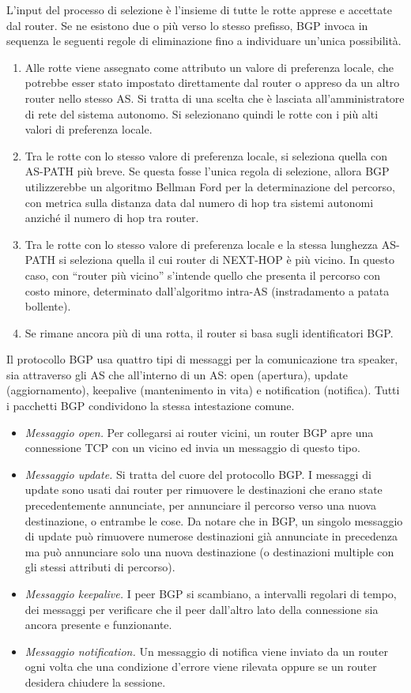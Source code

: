 L’input del processo di selezione è l’insieme di tutte le rotte apprese e accettate dal router. Se ne esistono due o più verso lo stesso prefisso, BGP invoca in sequenza le seguenti regole di eliminazione fino a individuare un’unica possibilità.
\begin{enumerate}
    \item Alle rotte viene assegnato come attributo un valore di preferenza locale, che potrebbe esser stato impostato direttamente dal router o appreso da un altro router nello stesso AS. Si tratta di una scelta che è lasciata all’amministratore di rete del sistema autonomo. Si selezionano quindi le rotte con i più alti valori di preferenza locale.
    \item Tra le rotte con lo stesso valore di preferenza locale, si seleziona quella con AS-PATH più breve. Se questa fosse l’unica regola di selezione, allora BGP utilizzerebbe un algoritmo Bellman Ford per la determinazione del percorso, con metrica sulla distanza data dal numero di hop tra sistemi autonomi anziché il numero di hop tra router.
    \item Tra le rotte con lo stesso valore di preferenza locale e la stessa lunghezza AS-PATH si seleziona quella il cui router di NEXT-HOP è più vicino. In questo caso, con “router più vicino” s’intende quello che presenta il percorso con costo minore, determinato dall’algoritmo intra-AS (instradamento a patata bollente).
    \item Se rimane ancora più di una rotta, il router si basa sugli identificatori BGP.
\end{enumerate}

Il protocollo BGP usa quattro tipi di messaggi per la comunicazione tra speaker, sia attraverso gli AS che all'interno di un AS: open (apertura), update (aggiornamento), keepalive (mantenimento in vita) e notification (notifica). Tutti i pacchetti BGP condividono la stessa intestazione comune.
\begin{itemize}
    \item \textit{Messaggio open.} Per collegarsi ai router vicini, un router BGP apre una connessione TCP con un vicino ed invia un messaggio di questo tipo.
    \item \textit{Messaggio update.} Si tratta del cuore del protocollo BGP. I messaggi di update sono usati dai router per rimuovere le destinazioni che erano state precedentemente annunciate, per annunciare il percorso verso una nuova destinazione, o entrambe le cose. Da notare che in BGP, un singolo messaggio di update può rimuovere numerose destinazioni già annunciate in precedenza ma può annunciare solo una nuova destinazione (o destinazioni multiple con gli stessi attributi di percorso).
    \item \textit{Messaggio keepalive.} I peer BGP si scambiano, a intervalli regolari di tempo, dei messaggi per verificare che il peer dall'altro lato della connessione sia ancora presente e funzionante.
    \item \textit{Messaggio notification.} Un messaggio di notifica viene inviato da un router ogni volta che una condizione d'errore viene rilevata oppure se un router desidera chiudere la sessione.
\end{itemize}

